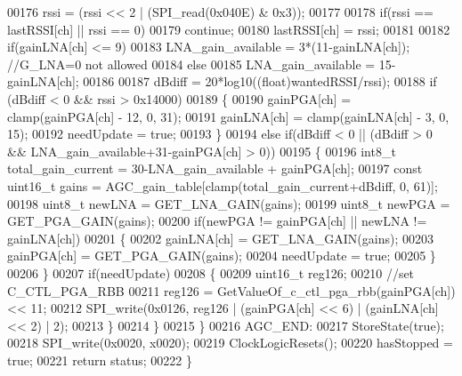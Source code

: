 \begin{DoxyCode}
00176             rssi = (rssi << 2 | (SPI_read(0x040E) & 0x3));
00177 
00178             \textcolor{keywordflow}{if}(rssi == lastRSSI[ch] || rssi == 0)
00179                 \textcolor{keywordflow}{continue};
00180             lastRSSI[ch] = rssi;
00181 
00182             \textcolor{keywordflow}{if}(gainLNA[ch] <= 9)
00183                 LNA\_gain\_available = 3*(11-gainLNA[ch]); \textcolor{comment}{//G\_LNA=0 not allowed}
00184             \textcolor{keywordflow}{else}
00185                 LNA\_gain\_available = 15-gainLNA[ch];
00186 
00187             dBdiff = 20*log10((\textcolor{keywordtype}{float})wantedRSSI/rssi);
00188             \textcolor{keywordflow}{if} (dBdiff < 0 && rssi > 0x14000)
00189             \{
00190                 gainPGA[ch] = clamp(gainPGA[ch] - 12, 0, 31);
00191                 gainLNA[ch] = clamp(gainLNA[ch] -  3, 0, 15);
00192                 needUpdate = \textcolor{keyword}{true};
00193             \}
00194             \textcolor{keywordflow}{else} \textcolor{keywordflow}{if}(dBdiff < 0 || (dBdiff > 0 && LNA\_gain\_available+31-gainPGA[ch] > 0))
00195             \{
00196                 int8\_t total\_gain\_current = 30-LNA\_gain\_available + gainPGA[ch];
00197                 \textcolor{keyword}{const} uint16\_t gains = AGC_gain_table[clamp(total\_gain\_current+dBdiff, 0, 61)];
00198                 uint8\_t newLNA = GET_LNA_GAIN(gains);
00199                 uint8\_t newPGA = GET_PGA_GAIN(gains);
00200                 \textcolor{keywordflow}{if}(newPGA != gainPGA[ch] || newLNA != gainLNA[ch])
00201                 \{
00202                     gainLNA[ch] = GET_LNA_GAIN(gains);
00203                     gainPGA[ch] = GET_PGA_GAIN(gains);
00204                     needUpdate = \textcolor{keyword}{true};
00205                 \}
00206             \}
00207             \textcolor{keywordflow}{if}(needUpdate)
00208             \{
00209                 uint16\_t reg126;
00210                 \textcolor{comment}{//set C\_CTL\_PGA\_RBB}
00211                 reg126 = GetValueOf_c_ctl_pga_rbb(gainPGA[ch]) << 11;
00212                 SPI_write(0x0126, reg126 | (gainPGA[ch] << 6) | (gainLNA[ch] << 2) | 2);
00213             \}
00214         \}
00215     \}
00216 AGC\_END:
00217     StoreState(\textcolor{keyword}{true});
00218     SPI_write(0x0020, x0020);
00219     ClockLogicResets();
00220     hasStopped = \textcolor{keyword}{true};
00221     \textcolor{keywordflow}{return} status;
00222 \}
\end{DoxyCode}
